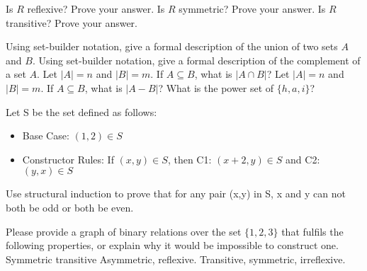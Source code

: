\documentclass[solution, letterpaper]{cs20exam}
\begin{document}
\subproblem Is $R$ reflexive? Prove your answer.
\subproblem Is $R$ symmetric? Prove your answer.
\subproblem Is $R$ transitive? Prove your answer.

\begin{solution}
\end{solution}


\pagebreak


\problem{}{}

\subproblem Using set-builder notation, give a formal description of the union of two sets $A$ and $B$. %
\subproblem Using set-builder notation, give a formal description of the complement of a set $A$. %
\subproblem Let $|A| = n$ and $|B| = m$. If $A \subseteq B$, what is $|A \cap B|$? %
\subproblem Let $|A| = n$ and $|B| = m$. If $A \subseteq B$, what is $|A - B|$? %
\subproblem What is the power set of $\{ h, a, i\}$? %

\begin{solution}
\end{solution}


\problem{}{}

Let S be the set defined as follows:
\begin{itemize}
\item Base Case: $(1,2) \in S$
\item Constructor Rules: If $(x,y)\in S$, then C1: $(x+2, y) \in S$ and C2: $(y,x) \in S$ 
\end{itemize}
Use structural induction to prove that for any pair (x,y) in S, x and y can not both be odd or both be even. 

\begin{solution}
\end{solution}

\problem{}{}
Please provide a graph of binary relations over the set $\{1,2,3\}$ that fulfils the following properties, or explain why it would be impossible to construct one. 
\subproblem Symmetric transitive
\subproblem Asymmetric, reflexive. 
\subproblem Transitive, symmetric, irreflexive. 

\begin{solution}
\end{solution}
\end{document}
